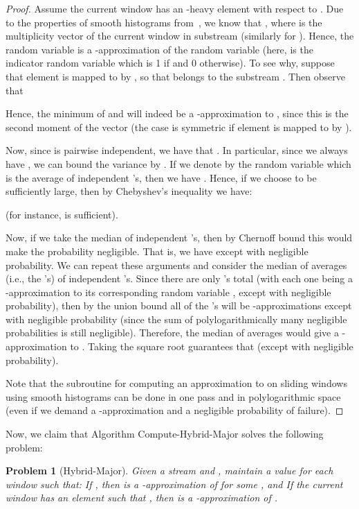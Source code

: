 \documentclass[11pt]{article}
\newtheorem{prob}{Problem}
\begin{document}
\begin{proof}
Assume the current window  has an -heavy element  with respect to .  Due to the properties of smooth
histograms from~\cite{BO07}, we know that , where  is the multiplicity vector
of the current window in substream  (similarly for ).  Hence, the random variable 
is a -approximation of the random variable  (here, 
is the indicator random variable which is 1 if  and 0 otherwise).  To see why, suppose that element  is mapped to  by ,
so that  belongs to the substream .  Then observe that

Hence, the minimum of  and  will indeed be a -approximation to ,
since this is the second moment of the vector  (the case is symmetric if element  is mapped to  by ).

Now, since  is pairwise independent, we have that .  In particular, since we always have ,
we can bound the variance by .  If we denote by  the random variable which is the average
of  independent 's, then we have .  Hence, if we choose  to be sufficiently
large, then by Chebyshev's inequality we have:

(for instance,  is sufficient).

Now, if we take the median  of  independent 's, then by Chernoff bound this would make the probability negligible.
That is, we have  except with negligible probability.  We can
repeat these arguments and consider the median of  averages (i.e., the 's) of  independent 's.  Since
there are only  's total (with each one being a -approximation to its corresponding random variable ,
except with negligible probability), then by the union bound all of the 's will be -approximations except with negligible probability
(since the sum of polylogarithmically many negligible probabilities is still negligible).  Therefore, the median of averages would give a
-approximation to .  Taking the square root guarantees that  (except with negligible
probability).

Note that the subroutine for computing an approximation to  on sliding windows using smooth histograms can be done in one pass and
in polylogarithmic space (even if we demand a -approximation and a negligible probability of failure).
\end{proof}

Now, we claim that Algorithm Compute-Hybrid-Major solves the following problem:
\begin{prob}[Hybrid-Major]
Given a stream  and , maintain a value  for each window  such
that:
 If , then  is a -approximation of  for some , and
 If the current window  has an element  such that
, then  is a -approximation of .
\end{prob}
\end{document}
